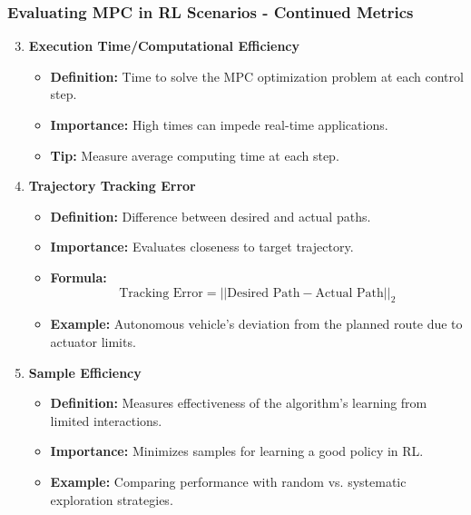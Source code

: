 \documentclass[aspectratio=169]{beamer}
\begin{document}
\begin{frame}[fragile]
    \frametitle{Evaluating MPC in RL Scenarios - Continued Metrics}
    \begin{enumerate}
        \setcounter{enumi}{2}
        \item \textbf{Execution Time/Computational Efficiency}
            \begin{itemize}
                \item \textbf{Definition:} Time to solve the MPC optimization problem at each control step.
                \item \textbf{Importance:} High times can impede real-time applications.
                \item \textbf{Tip:} Measure average computing time at each step.
            \end{itemize}
        \item \textbf{Trajectory Tracking Error}
            \begin{itemize}
                \item \textbf{Definition:} Difference between desired and actual paths.
                \item \textbf{Importance:} Evaluates closeness to target trajectory.
                \item \textbf{Formula:} 
                \begin{equation}
                \text{Tracking Error} = ||\text{Desired Path} - \text{Actual Path}||_2
                \end{equation}
                \item \textbf{Example:} Autonomous vehicle's deviation from the planned route due to actuator limits.
            \end{itemize}
        \item \textbf{Sample Efficiency}
            \begin{itemize}
                \item \textbf{Definition:} Measures effectiveness of the algorithm's learning from limited interactions.
                \item \textbf{Importance:} Minimizes samples for learning a good policy in RL.
                \item \textbf{Example:} Comparing performance with random vs. systematic exploration strategies.
            \end{itemize}
    \end{enumerate}
\end{frame}
\end{document}
